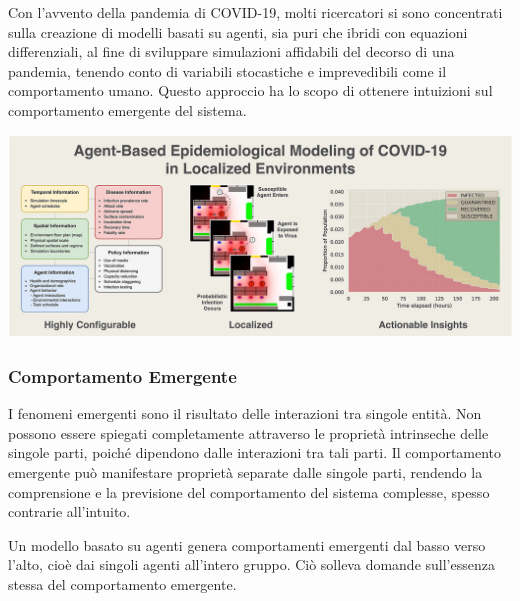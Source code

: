 Con l'avvento della pandemia di COVID-19, molti ricercatori si sono 
concentrati sulla creazione di modelli basati su agenti, sia puri che 
ibridi con equazioni differenziali, al fine di sviluppare simulazioni 
affidabili del decorso di una pandemia, tenendo conto di variabili 
stocastiche e imprevedibili come il comportamento umano. Questo approccio 
ha lo scopo di ottenere intuizioni sul comportamento emergente del sistema.

\begin{minipage}{\linewidth}
    \centering
    \includegraphics{img/1-s2.0-S0010482522001883-ga1.jpg}
    \label{fig:abm_covid}
\end{minipage}

\subsubsection{Comportamento Emergente}

I fenomeni emergenti sono il risultato delle interazioni tra singole entità. 
Non possono essere spiegati completamente attraverso le proprietà 
intrinseche delle singole parti, poiché dipendono dalle interazioni tra 
tali parti. Il comportamento emergente può manifestare proprietà separate 
dalle singole parti, rendendo la comprensione e la previsione del 
comportamento del sistema complesse, spesso contrarie all'intuito.

Un modello basato su agenti genera comportamenti emergenti dal basso verso 
l'alto, cioè dai singoli agenti all'intero gruppo. Ciò solleva domande 
sull'essenza stessa del comportamento emergente.

